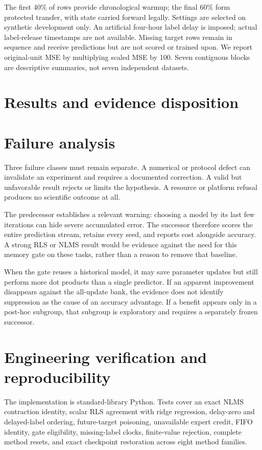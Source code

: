 \documentclass[10pt]{article}
\begin{document}
The first 40\% of rows provide chronological warmup; the final 60\% form protected transfer, with state carried forward legally. Settings are selected on synthetic development only. An artificial four-hour label delay is imposed; actual label-release timestamps are not available. Missing target rows remain in sequence and receive predictions but are not scored or trained upon. We report original-unit MSE by multiplying scaled MSE by 100. Seven contiguous blocks are descriptive summaries, not seven independent datasets.

\section{Results and evidence disposition}


\section{Failure analysis}
Three failure classes must remain separate. A numerical or protocol defect can invalidate an experiment and requires a documented correction. A valid but unfavorable result rejects or limits the hypothesis. A resource or platform refusal produces no scientific outcome at all.

The predecessor establishes a relevant warning: choosing a model by its last few iterations can hide severe accumulated error. The successor therefore scores the entire prediction stream, retains every seed, and reports cost alongside accuracy. A strong RLS or NLMS result would be evidence against the need for this memory gate on these tasks, rather than a reason to remove that baseline.

When the gate reuses a historical model, it may save parameter updates but still perform more dot products than a single predictor. If an apparent improvement disappears against the all-update bank, the evidence does not identify suppression as the cause of an accuracy advantage. If a benefit appears only in a post-hoc subgroup, that subgroup is exploratory and requires a separately frozen successor.

\section{Engineering verification and reproducibility}
The implementation is standard-library Python. Tests cover an exact NLMS contraction identity, scalar RLS agreement with ridge regression, delay-zero and delayed-label ordering, future-target poisoning, unavailable expert credit, FIFO identity, gate eligibility, missing-label clocks, finite-value rejection, complete method resets, and exact checkpoint restoration across eight method families.
\end{document}
